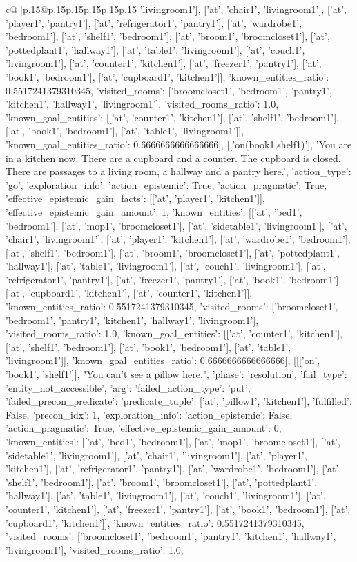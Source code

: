 \documentclass{article}
\begin{document}
{\begin{supertabular}{c@{$\;$}|p{.15\linewidth}@{}p{.15\linewidth}p{.15\linewidth}p{.15\linewidth}p{.15\linewidth}p{.15\linewidth}}
{{{'livingroom1'], ['at', 'chair1', 'livingroom1'], ['at', 'player1', 'pantry1'], ['at', 'refrigerator1', 'pantry1'], ['at', 'wardrobe1', 'bedroom1'], ['at', 'shelf1', 'bedroom1'], ['at', 'broom1', 'broomcloset1'], ['at', 'pottedplant1', 'hallway1'], ['at', 'table1', 'livingroom1'], ['at', 'couch1', 'livingroom1'], ['at', 'counter1', 'kitchen1'], ['at', 'freezer1', 'pantry1'], ['at', 'book1', 'bedroom1'], ['at', 'cupboard1', 'kitchen1']], 'known_entities_ratio': 0.5517241379310345, 'visited_rooms': ['broomcloset1', 'bedroom1', 'pantry1', 'kitchen1', 'hallway1', 'livingroom1'], 'visited_rooms_ratio': 1.0, 'known_goal_entities': [['at', 'counter1', 'kitchen1'], ['at', 'shelf1', 'bedroom1'], ['at', 'book1', 'bedroom1'], ['at', 'table1', 'livingroom1']], 'known_goal_entities_ratio': 0.6666666666666666}}], [['on(book1,shelf1)'], 'You are in a kitchen now. There are a cupboard and a counter. The cupboard is closed. There are passages to a living room, a hallway and a pantry here.', {'action_type': 'go', 'exploration_info': {'action_epistemic': True, 'action_pragmatic': True, 'effective_epistemic_gain_facts': [['at', 'player1', 'kitchen1']], 'effective_epistemic_gain_amount': 1, 'known_entities': [['at', 'bed1', 'bedroom1'], ['at', 'mop1', 'broomcloset1'], ['at', 'sidetable1', 'livingroom1'], ['at', 'chair1', 'livingroom1'], ['at', 'player1', 'kitchen1'], ['at', 'wardrobe1', 'bedroom1'], ['at', 'shelf1', 'bedroom1'], ['at', 'broom1', 'broomcloset1'], ['at', 'pottedplant1', 'hallway1'], ['at', 'table1', 'livingroom1'], ['at', 'couch1', 'livingroom1'], ['at', 'refrigerator1', 'pantry1'], ['at', 'freezer1', 'pantry1'], ['at', 'book1', 'bedroom1'], ['at', 'cupboard1', 'kitchen1'], ['at', 'counter1', 'kitchen1']], 'known_entities_ratio': 0.5517241379310345, 'visited_rooms': ['broomcloset1', 'bedroom1', 'pantry1', 'kitchen1', 'hallway1', 'livingroom1'], 'visited_rooms_ratio': 1.0, 'known_goal_entities': [['at', 'counter1', 'kitchen1'], ['at', 'shelf1', 'bedroom1'], ['at', 'book1', 'bedroom1'], ['at', 'table1', 'livingroom1']], 'known_goal_entities_ratio': 0.6666666666666666}}], [[['on', 'book1', 'shelf1']], "You can't see a pillow here.", {'phase': 'resolution', 'fail_type': 'entity_not_accessible', 'arg': {'failed_action_type': 'put', 'failed_precon_predicate': {'predicate_tuple': ['at', 'pillow1', 'kitchen1'], 'fulfilled': False, 'precon_idx': 1}}, 'exploration_info': {'action_epistemic': False, 'action_pragmatic': True, 'effective_epistemic_gain_amount': 0, 'known_entities': [['at', 'bed1', 'bedroom1'], ['at', 'mop1', 'broomcloset1'], ['at', 'sidetable1', 'livingroom1'], ['at', 'chair1', 'livingroom1'], ['at', 'player1', 'kitchen1'], ['at', 'refrigerator1', 'pantry1'], ['at', 'wardrobe1', 'bedroom1'], ['at', 'shelf1', 'bedroom1'], ['at', 'broom1', 'broomcloset1'], ['at', 'pottedplant1', 'hallway1'], ['at', 'table1', 'livingroom1'], ['at', 'couch1', 'livingroom1'], ['at', 'counter1', 'kitchen1'], ['at', 'freezer1', 'pantry1'], ['at', 'book1', 'bedroom1'], ['at', 'cupboard1', 'kitchen1']], 'known_entities_ratio': 0.5517241379310345, 'visited_rooms': ['broomcloset1', 'bedroom1', 'pantry1', 'kitchen1', 'hallway1', 'livingroom1'], 'visited_rooms_ratio': 1.0, }}}
\end{supertabular}}
\end{document}
